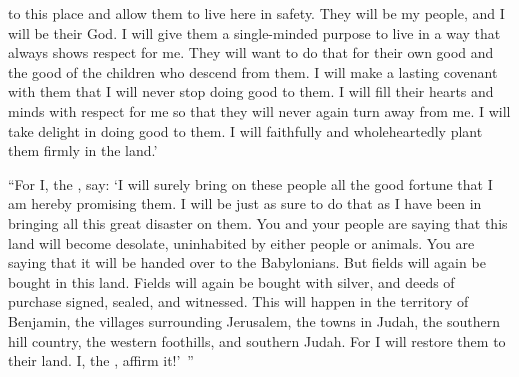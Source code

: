 {to
this
place
and allow them to live
here in safety.
They will be
my people,
and I
will be
their God.
I will give
them a single-minded
purpose
to live in a way
that always
shows respect
for me. They will want to do that
for their own good and the good
of the children
who descend from them.
I will make
a lasting
covenant
with them that
I will never
stop
doing good
to them.
I will
fill
their hearts
and minds with respect for me so that they will never again turn away from me.
I will take delight
in doing good
to them. I will faithfully
and wholeheartedly
plant
them firmly in the land.’
\par }{\PP {}“For
I,
the {}, say: ‘I
will surely bring
on
these
people
all
the good
fortune that
I am
hereby promising
them. I will be just
as sure to do
that as I have been in bringing
all
this
great
disaster
on them.
You and your people are saying
that this land
will become desolate,
uninhabited
by either people
or animals.
You are saying that it will
be handed
over to the Babylonians.
But fields
will again be bought
in this
land.
Fields
will again be bought
with silver,
and deeds of purchase
signed,
sealed,
and witnessed.
This
will happen in the territory
of Benjamin,
the villages surrounding
Jerusalem,
the towns
in Judah,
the southern hill country,
the western foothills,
and southern
Judah. For
I will restore
them
to their land. I, the
{}, affirm it!’ ”

}
